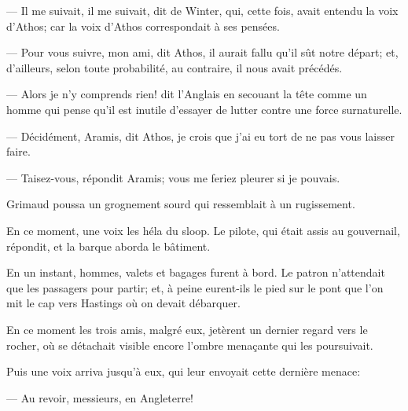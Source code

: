 — Il me suivait, il me suivait, dit de Winter, qui, cette fois, avait entendu la voix d'Athos; car la voix d'Athos correspondait à ses pensées.

— Pour vous suivre, mon ami, dit Athos, il aurait fallu qu'il sût notre départ; et, d'ailleurs, selon toute probabilité, au contraire, il nous avait précédés.

— Alors je n'y comprends rien! dit l'Anglais en secouant la tête comme un homme qui pense qu'il est inutile d'essayer de lutter contre une force surnaturelle.

— Décidément, Aramis, dit Athos, je crois que j'ai eu tort de ne pas vous laisser faire.

— Taisez-vous, répondit Aramis; vous me feriez pleurer si je pouvais.

Grimaud poussa un grognement sourd qui ressemblait à un rugissement.

En ce moment, une voix les héla du sloop. Le pilote, qui était assis au gouvernail, répondit, et la barque aborda le bâtiment.

En un instant, hommes, valets et bagages furent à bord. Le patron n'attendait que les passagers pour partir; et, à peine eurent-ils le pied sur le pont que l'on mit le cap vers Hastings où on devait débarquer.

En ce moment les trois amis, malgré eux, jetèrent un dernier regard vers le rocher, où se détachait visible encore l'ombre menaçante qui les poursuivait.

Puis une voix arriva jusqu'à eux, qui leur envoyait cette dernière menace:

— Au revoir, messieurs, en Angleterre!